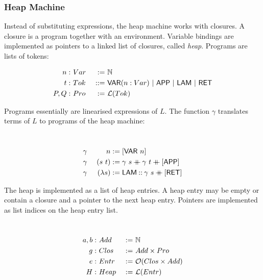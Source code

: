 \subsubsection{Heap Machine}
\label{sec:heap-def}
%

Instead of substituting expressions, the heap machine works with closures.  A closure is a program together with an environment.  Variable bindings
are implemented as pointers to a linked list of closures, called \textit{heap}.  Programs are lists of tokens:
\begin{definition}[Program][Pro]
  \label{def:Tok}
  \begin{alignat*}{2}
    n:   &~Var  &~:=~& \mathbb{N} \\
    t:   &~Tok  &~::=~& \mathsf{VAR}(n:Var) ~|~ \mathsf{APP} ~|~ \mathsf{LAM} ~|~ \mathsf{RET} \\
    P,Q: &~Pro  &~:=~& \mathcal{L}(Tok)
  \end{alignat*}
\end{definition}

Programs essentially are linearised expressions of $L$.  The function $\gamma$ translates terms of $L$ to programs of the heap machine:
\begin{definition}
  ~
  \begin{alignat*}{2}
    &\gamma&~n           &:= [\mathsf{VAR}~n] \\
    &\gamma&~(s~t)       &:= \gamma~s \mathbin{+\mkern-10mu+} \gamma~t \mathbin{+\mkern-10mu+} [\mathsf{APP}] \\
    &\gamma&~(\lambda s) &:= \mathsf{LAM} \mathbin{::} \gamma~s \mathbin{+\mkern-10mu+} [\mathsf{RET}]
  \end{alignat*}
\end{definition}

The heap is implemented as a list of heap entries.  A heap entry may be empty or contain a closure and a pointer to the next heap entry.  Pointers are
implemented as list indices on the heap entry list.
\begin{definition}
  \label{def:Heap}
  ~
  \begin{alignat*}{2}
    a,b: &~Add  &~:=~& \mathbb{N} \\
    g:   &~Clos &~:=~& Add \times Pro \\
    e:   &~Entr &~:=~& \mathcal{O}(Clos \times Add) \\
    H:   &~Heap &~:=~& \mathcal{L}(Entr)
  \end{alignat*}
\end{definition}

